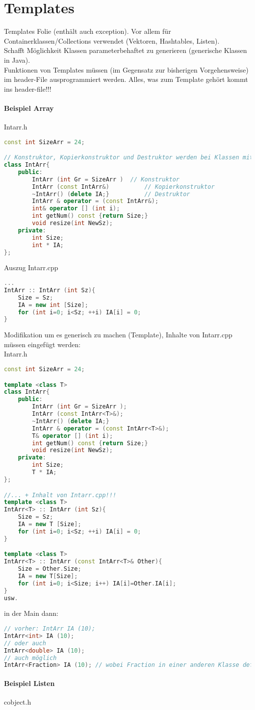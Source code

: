 \section{Templates}
Templates Folie (enthält auch exception).
Vor allem für Containerklassen/Collections verwendet (Vektoren, Hashtables, Listen).\\
Schafft Möglichkeit Klassen parameterbehaftet zu generieren (generische Klassen in Java).\\
Funktionen von Templates müssen (im Gegensatz zur bisherigen Vorgehensweise) im header-File ausprogrammiert werden. Alles, was zum Template gehört kommt ins header-file!!!
\paragraph{Beispiel Array} Intarr.h
\begin{lstlisting}[language=C++]
const int SizeArr = 24;

// Konstruktor, Kopierkonstruktor und Destruktor werden bei Klassen mit Pointer immer benötigt!
class IntArr{
	public:
		IntArr (int Gr = SizeArr ) 	// Konstruktor
		IntArr (const IntArr&) 			// Kopierkonstruktor
		~IntArr() (delete IA;}			// Destruktor
		IntArr & operator = (const IntArr&);
		int& operator [] (int i);	
		int getNum() const {return Size;}
		void resize(int NewSz);
	private:
		int Size;
		int * IA;
};
\end{lstlisting}
Auszug Intarr.cpp
\begin{lstlisting}[language=C++]
...
IntArr :: IntArr (int Sz){
	Size = Sz;
	IA = new int [Size];
	for (int i=0; i<Sz; ++i) IA[i] = 0;
}
\end{lstlisting}
Modifikation um es generisch zu machen (Template), Inhalte von Intarr.cpp müssen eingefügt werden:\\
Intarr.h
\begin{lstlisting}[language=C++]
const int SizeArr = 24;

template <class T>
class IntArr{
	public:
		IntArr (int Gr = SizeArr );
		IntArr (const IntArr<T>&);
		~IntArr() (delete IA;}
		IntArr & operator = (const IntArr<T>&);
		T& operator [] (int i);	
		int getNum() const {return Size;}
		void resize(int NewSz);
	private:
		int Size;
		T * IA;
};

//... + Inhalt von Intarr.cpp!!!
template <class T>
IntArr<T> :: IntArr (int Sz){
	Size = Sz;
	IA = new T [Size];
	for (int i=0; i<Sz; ++i) IA[i] = 0;
}

template <class T>
IntArr<T> :: IntArr (const IntArr<T>& Other){
	Size = Other.Size;
	IA = new T[Size];
	for (int i=0; i<Size; i++) IA[i]=Other.IA[i];
}
usw.
\end{lstlisting}
in der Main dann:
\begin{lstlisting}[language=C++]
// vorher: IntArr IA (10);
IntArr<int> IA (10);
// oder auch 
IntArr<double> IA (10);
// auch möglich 
IntArr<Fraction> IA (10); // wobei Fraction in einer anderen Klasse definiert ist.
\end{lstlisting}

\paragraph{Beispiel Listen}
cobject.h

\newpage
\printbibliography
